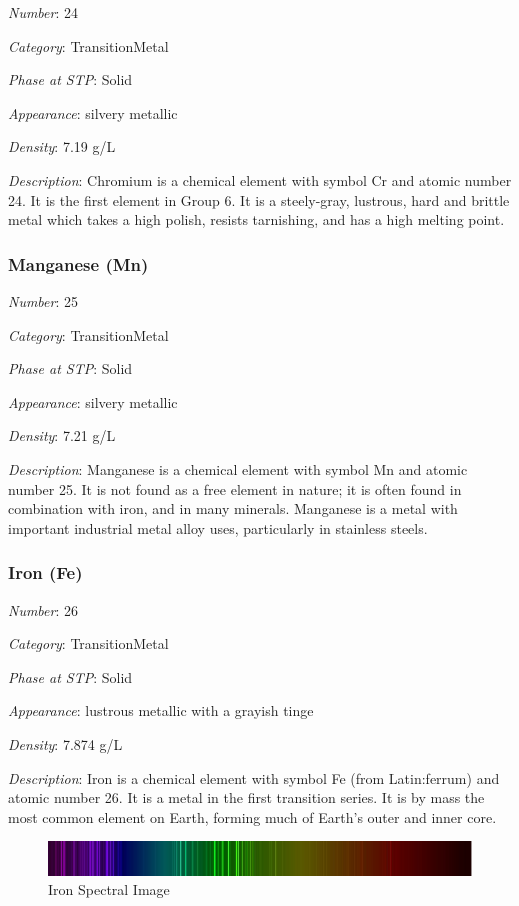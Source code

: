 \documentclass{article}
\begin{document}
\textit{Number}: 24

\textit{Category}: TransitionMetal

\textit{Phase at STP}: Solid

\textit{Appearance}: silvery metallic

\textit{Density}: 7.19 g/L

\textit{Description}: Chromium is a chemical element with symbol Cr and atomic number 24. It is the first element in Group 6. It is a steely-gray, lustrous, hard and brittle metal which takes a high polish, resists tarnishing, and has a high melting point.

\hypertarget{subsubsection::Mn}{}\subsubsection{Manganese (Mn)}

\textit{Number}: 25

\textit{Category}: TransitionMetal

\textit{Phase at STP}: Solid

\textit{Appearance}: silvery metallic

\textit{Density}: 7.21 g/L

\textit{Description}: Manganese is a chemical element with symbol Mn and atomic number 25. It is not found as a free element in nature; it is often found in combination with iron, and in many minerals. Manganese is a metal with important industrial metal alloy uses, particularly in stainless steels.

\hypertarget{subsubsection::Fe}{}\subsubsection{Iron (Fe)}

\textit{Number}: 26

\textit{Category}: TransitionMetal

\textit{Phase at STP}: Solid

\textit{Appearance}: lustrous metallic with a grayish tinge

\textit{Density}: 7.874 g/L

\textit{Description}: Iron is a chemical element with symbol Fe (from Latin:ferrum) and atomic number 26. It is a metal in the first transition series. It is by mass the most common element on Earth, forming much of Earth's outer and inner core.

\immediate{}
\begin{figure}[!ht]
    \centering
    \includegraphics[width=12cm]{./resources/spectral_img/Iron_Spectrum.jpg}
    \caption{Iron Spectral Image}
\end{figure}
\end{document}
